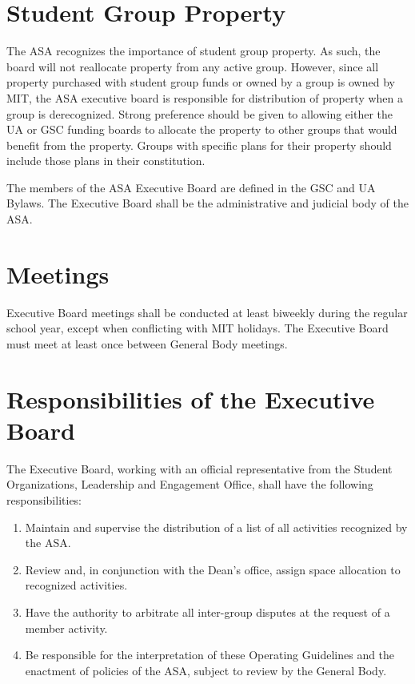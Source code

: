 \documentclass[12pt]{article}
\begin{document}
\section{Student Group Property}
The ASA recognizes the importance of student group property. As such, the board will not reallocate
property from any active group. However, since all property purchased with student group funds or
owned by a group is owned by MIT, the ASA executive board is responsible for distribution of property
when a group is derecognized. Strong preference should be given to allowing either the UA or GSC
funding boards to allocate the property to other groups that would benefit from the property. Groups
with specific plans for their property should include those plans in their constitution.


\label{art:asa_exec}
The members of the ASA Executive Board are defined in the GSC and UA Bylaws. The Executive Board
shall be the administrative and judicial body of the ASA.


\section{Meetings}
Executive Board meetings shall be conducted at least biweekly during the regular school year, except
when conflicting with MIT holidays. The Executive Board must meet at least once between General
Body meetings.

\section{Responsibilities of the Executive Board}
The Executive Board, working with an official representative from the Student Organizations,
Leadership and Engagement Office, shall have the following responsibilities:
\begin{enumerate}
    \item Maintain and supervise the distribution of a list of all activities recognized by the ASA.
    \item Review and, in conjunction with the Dean’s office, assign space allocation to
recognized activities.
    \item Have the authority to arbitrate all inter-group disputes at the request of a member activity.
    \item Be responsible for the interpretation of these Operating Guidelines and the enactment of
policies of the ASA, subject to review by the General Body.
\end{enumerate}
\end{document}
